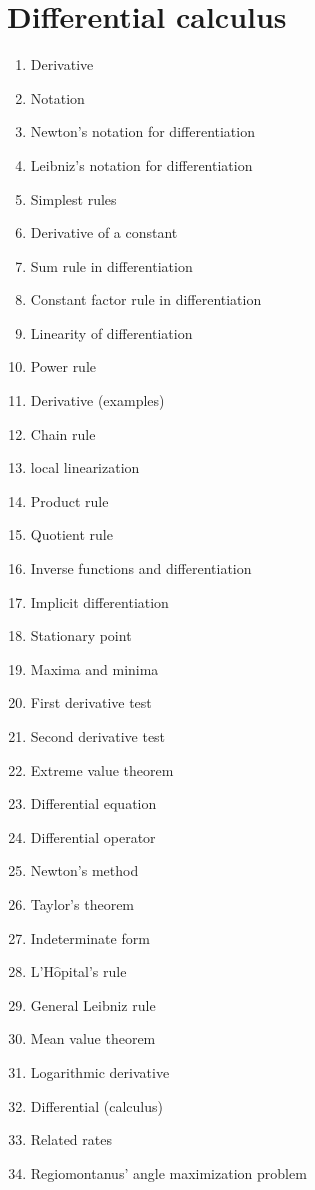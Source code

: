 \section{Differential calculus}
\begin{enumerate}
\item Derivative
\item Notation
\item Newton's notation for differentiation
\item Leibniz's notation for differentiation
\item Simplest rules
\item Derivative of a constant
\item Sum rule in differentiation
\item Constant factor rule in differentiation
\item Linearity of differentiation
\item Power rule
\item Derivative (examples)
\item Chain rule
\item local linearization
\item Product rule
\item Quotient rule
\item Inverse functions and differentiation
\item Implicit differentiation
\item Stationary point
\item Maxima and minima
\item First derivative test
\item Second derivative test
\item Extreme value theorem
\item Differential equation
\item Differential operator
\item Newton's method
\item Taylor's theorem
\item Indeterminate form
\item L'H$\hat{\textrm{o}}$pital's rule
\item General Leibniz rule
\item Mean value theorem
\item Logarithmic derivative
\item Differential (calculus)
\item Related rates
\item Regiomontanus' angle maximization problem
\end{enumerate}

